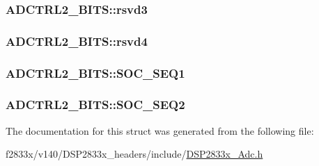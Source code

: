 \subsubsection[{rsvd3}]{ A\+D\+C\+T\+R\+L2\+\_\+\+B\+I\+T\+S\+::rsvd3}\label{struct_a_d_c_t_r_l2___b_i_t_s_a4e501bc4865b8ca877c1643c91da6e77}
\hypertarget{struct_a_d_c_t_r_l2___b_i_t_s_aa05e525862c591dd3bf377e93c0e23cf}{}
\subsubsection[{rsvd4}]{ A\+D\+C\+T\+R\+L2\+\_\+\+B\+I\+T\+S\+::rsvd4}\label{struct_a_d_c_t_r_l2___b_i_t_s_aa05e525862c591dd3bf377e93c0e23cf}
\hypertarget{struct_a_d_c_t_r_l2___b_i_t_s_ac68520557f1472730d25c16787953d74}{}
\subsubsection[{S\+O\+C\+\_\+\+S\+E\+Q1}]{ A\+D\+C\+T\+R\+L2\+\_\+\+B\+I\+T\+S\+::\+S\+O\+C\+\_\+\+S\+E\+Q1}\label{struct_a_d_c_t_r_l2___b_i_t_s_ac68520557f1472730d25c16787953d74}
\hypertarget{struct_a_d_c_t_r_l2___b_i_t_s_a416e21b23c8c4104de5cc399b0cd1b36}{}
\subsubsection[{S\+O\+C\+\_\+\+S\+E\+Q2}]{ A\+D\+C\+T\+R\+L2\+\_\+\+B\+I\+T\+S\+::\+S\+O\+C\+\_\+\+S\+E\+Q2}\label{struct_a_d_c_t_r_l2___b_i_t_s_a416e21b23c8c4104de5cc399b0cd1b36}


The documentation for this struct was generated from the following file\+:\begin{DoxyCompactItemize}
\item 
f2833x/v140/\+D\+S\+P2833x\+\_\+headers/include/\hyperlink{_d_s_p2833x___adc_8h}{D\+S\+P2833x\+\_\+\+Adc.\+h}\end{DoxyCompactItemize}
